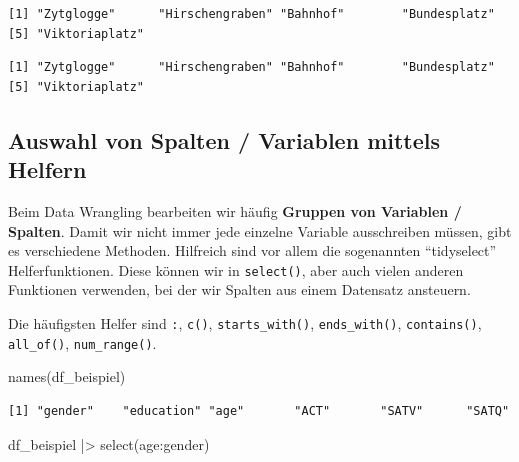 \documentclass[
  letterpaper,
  DIV=11,
  numbers=noendperiod]{scrreprt}
\newenvironment{Shaded}{\begin{snugshade}}{\end{snugshade}}
\newcommand{\CommentTok}[1]{\textcolor[rgb]{0.37,0.37,0.37}{#1}}
\newcommand{\FunctionTok}[1]{\textcolor[rgb]{0.28,0.35,0.67}{#1}}
\newcommand{\NormalTok}[1]{\textcolor[rgb]{0.00,0.23,0.31}{#1}}
\newcommand{\SpecialCharTok}[1]{\textcolor[rgb]{0.37,0.37,0.37}{#1}}
\begin{document}
\begin{verbatim}
[1] "Zytglogge"      "Hirschengraben" "Bahnhof"        "Bundesplatz"   
[5] "Viktoriaplatz" 
\end{verbatim}

\begin{Shaded}
\end{Shaded}

\begin{verbatim}
[1] "Zytglogge"      "Hirschengraben" "Bahnhof"        "Bundesplatz"   
[5] "Viktoriaplatz" 
\end{verbatim}

\subsection{Auswahl von Spalten / Variablen mittels
Helfern}\label{auswahl-von-spalten-variablen-mittels-helfern}

Beim Data Wrangling bearbeiten wir häufig \textbf{Gruppen von Variablen
/ Spalten}. Damit wir nicht immer jede einzelne Variable ausschreiben
müssen, gibt es verschiedene Methoden. Hilfreich sind vor allem die
sogenannten ``tidyselect'' Helferfunktionen. Diese können wir in
\texttt{select()}, aber auch vielen anderen Funktionen verwenden, bei
der wir Spalten aus einem Datensatz ansteuern.

Die häufigsten Helfer sind \texttt{:}, \texttt{c()},
\texttt{starts\_with()}, \texttt{ends\_with()}, \texttt{contains()},
\texttt{all\_of()}, \texttt{num\_range()}.

\begin{Shaded}
\begin{Highlighting}[]
\FunctionTok{names}\NormalTok{(df\_beispiel)}
\end{Highlighting}
\end{Shaded}

\begin{verbatim}
[1] "gender"    "education" "age"       "ACT"       "SATV"      "SATQ"     
\end{verbatim}

\begin{Shaded}
\begin{Highlighting}[]
\NormalTok{df\_beispiel }\SpecialCharTok{|\textgreater{}} \FunctionTok{select}\NormalTok{(age}\SpecialCharTok{:}\NormalTok{gender)}
\end{Highlighting}
\end{Shaded}
\end{document}
